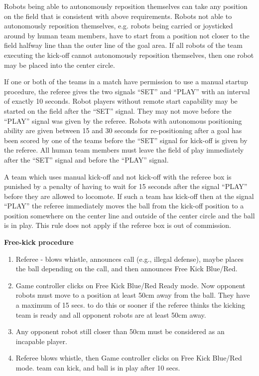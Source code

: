 Robots being able to autonomously reposition themselves can take any position on the field that is consistent with above requirements. Robots not able to autonomously reposition themselves, e.g. robots being carried or joysticked around by human team members, have to start
from a position not closer to the field halfway line than the outer line of the goal area. If all robots of the team executing the kick-off cannot autonomously reposition themselves, then one robot may be placed into the center circle.

If one or both of the teams in a match have permission to use a manual startup procedure, the referee gives the two signals ``SET'' and ``PLAY'' with an interval of exactly
10 seconds. Robot players without remote start capability may be started on the field after the ``SET'' signal. They may not move before the ``PLAY'' signal was given
by the referee. Robots with autonomous positioning ability are given between 15 and 30 seconds for re-positioning after a goal has been scored by one of the teams before the ``SET'' signal for kick-off is given by the referee. All human team members must leave the field of play
immediately after the ``SET'' signal and before the ``PLAY'' signal.

A team which uses manual kick-off and not kick-off with the referee box is punished by a penalty of having to wait for 15 seconds after the signal ``PLAY'' before they are
allowed to locomote. If such a team has kick-off then at the signal ``PLAY'' the referee immediately moves the ball from the kick-off position to a position somewhere on
the center line and outside of the center circle and the ball is in play. This rule does not apply if the referee box is out of commission.

\bigskip

{\bfseries Free-kick procedure}

\begin{enumerate}
\item Referee - blows whistle, announces call (e.g., illegal defense), maybe places the ball depending on the call, and then announces Free Kick Blue/Red.
\item Game controller clicks on Free Kick Blue/Red Ready mode. Now opponent robots must move to a position at least 50cm away from the ball. They have a maximum of 15 secs. to do this or sooner if the referee thinks the kicking team is ready and all opponent robots are at least 50cm
away.
\item Any opponent robot still closer than 50cm must be considered as an incapable player.
\item Referee blows whistle, then Game controller clicks on Free Kick Blue/Red mode. team can kick, and ball is in play after 10 secs.
\end{enumerate}

